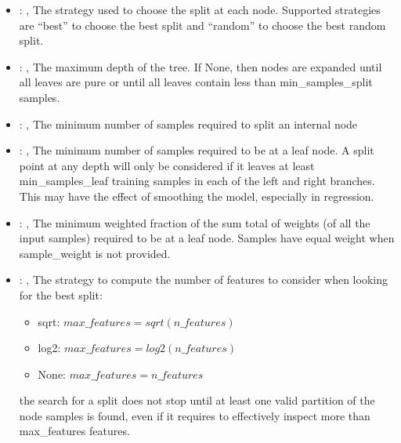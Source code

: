 \begin{itemize}
    \item {}: ,
      The strategy used to choose the split at each node. Supported strategies are ``best''
      to choose the best split and ``random'' to choose the best random split.

    \item {}: ,
      The maximum depth of the tree. If None, then nodes are expanded until all leaves are pure
      or until all leaves contain less than min\_samples\_split samples.

    \item {}: ,
      The minimum number of samples required to split an internal node

    \item {}: ,
      The minimum number of samples required to be at a leaf node. A split point at any
      depth will only be considered if it leaves at least min\_samples\_leaf training samples in
      each                                                  of the left and right branches. This may
      have the effect of smoothing the model, especially
      in regression.

    \item {}: ,
      The minimum weighted fraction of the sum total of weights (of all the input samples)
      required to be at a leaf node. Samples have equal weight when sample\_weight is not provided.

    \item {}: ,
      The strategy to compute the number of features to consider when looking for the best split:
      \begin{itemize}                                                     \item sqrt:
      $max\_features=sqrt(n\_features)$                                                     \item
      log2: $max\_features=log2(n\_features)$
      \item None: $max\_features=n\_features$
      \end{itemize}                                                   \nb the search for a split
      does not stop until at least one valid partition of the node
      samples is found, even if it requires to effectively inspect more than max\_features features.


\end{itemize}
